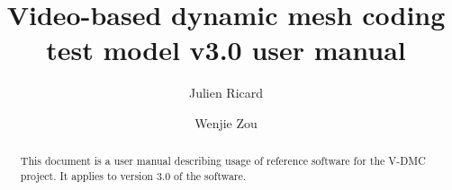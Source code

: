 \documentclass[a4paper,11pt]{mpegdoc}
\title{Video-based dynamic mesh coding test model v3.0 user manual}
\author{%
  Julien Ricard	\email{julien.ricard@interdital.com}  
\and
  Wenjie Zou \email{wjzou@xidian.edu.cn} 
}
\begin{document}
\maketitle
\begin{abstract}
This document is a user manual describing usage of reference software
for the V-DMC project. It applies to version 3.0 of the software.
\end{abstract}
\newpage

\tableofcontents

\newpage









 



%
\end{document}
